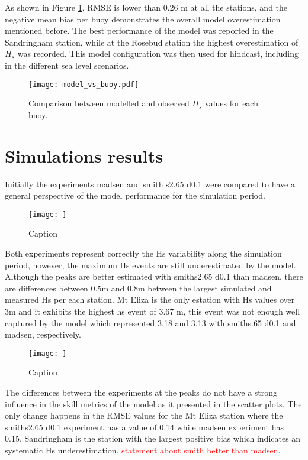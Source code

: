 \documentclass[12pt]{article}
\begin{document}
As shown in Figure \ref{fig:qqplot}, RMSE is lower than 0.26 m at all the stations, and the negative mean bias per buoy demonstrates the overall model overestimation mentioned before. The best performance of the model was reported in the Sandringham station, while at the Rosebud station the highest overestimation of $H_{s}$ was recorded. This model configuration was then used for hindcast, including in the different sea level scenarios.

\begin{figure}[p]
\centering  
  \texttt{[image: model\_vs\_buoy.pdf]}
  \caption{Comparison between modelled and observed $H_{s}$ values for each buoy.}
  \label{fig:qqplot}
\end{figure}


\section{Simulations results}

Initially the experiments madsen and smith s2.65 d0.1 were compared to have a general perspective of the model performance for the simulation period. 

\begin{figure}
    \centering
    \texttt{[image: ]}
    \caption{Caption}
    \label{fig:enter-label}
\end{figure}

Both experiments represent correctly the Hs variability along the simulation period, however, the maximum Hs events are still underestimated by the model. Although the peaks are better estimated with smiths2.65 d0.1 than madsen, there are differences between 0.5m and 0.8m between the largest simulated and measured Hs per each station. Mt Eliza is the only estation with Hs values over 3m and it exhibits the highest hs event of 3.67 m, this event was not enough well captured by the model which represented 3.18 and 3.13 with smiths.65 d0.1 and madsen, respectively.

\begin{figure}
    \centering
    \texttt{[image: ]}
    \caption{Caption}
    \label{fig:enter-label}
\end{figure}

The differences between the experiments at the peaks do not have a strong influence in the skill metrics of the model as it presented in the scatter plots. The only change happens in the RMSE values for the Mt Eliza station where the smiths2.65 d0.1 experiment has a value of 0.14 while madsen experiment has 0.15. Sandringham is the station with the largest positive bias which indicates an systematic Hs underestimation. \textcolor{red}{statement about smith better than madsen}.
\end{document}
